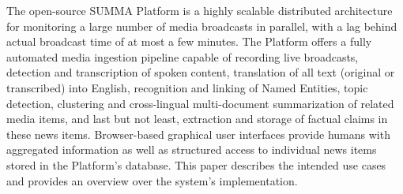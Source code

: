 The open-source SUMMA Platform is a highly scalable distributed architecture for monitoring a large number of media broadcasts in parallel, with a lag behind actual broadcast time of at most a few minutes. The Platform offers a fully automated media ingestion pipeline capable of recording live broadcasts, detection and transcription of spoken content, translation of all text (original or transcribed) into English, recognition and linking of Named Entities, topic detection, clustering and cross-lingual multi-document summarization of related media items, and last but not least, extraction and storage of factual claims in these news items. Browser-based graphical user interfaces provide humans with aggregated information as well as structured access to individual news items stored in the Platform's database. This paper describes the intended use cases and provides an overview over the system's implementation.
